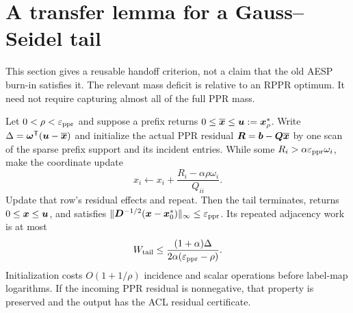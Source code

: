 \section{A transfer lemma for a Gauss--Seidel tail}
\label{sec:revisit-relative-tail}
This section gives a reusable handoff criterion, not a claim that the old
AESP burn-in satisfies it. The relevant mass deficit is relative to an RPPR
optimum. It need not require capturing almost all of the full PPR mass.

\begin{proposition}
\label{prop:revisit-relative-tail}
Let $0<\rho<\varepsilon_{\mathrm{ppr}}$ and suppose a prefix returns
$0\leq\overline{\bm{x}}\leq\bm{u}:=\bm{x}_\rho^*$.
Write $\Delta=\bm{\omega}^{\mathsf{T}}(\bm{u}-\overline{\bm{x}})$ and initialize the actual
PPR residual $\bm R=\bm{b}-\bm{Q}\overline{\bm{x}}$ by one scan of the sparse prefix
support and its incident entries. While some
$R_i>\alpha\varepsilon_{\mathrm{ppr}}\omega_i$, make the coordinate update
\begin{equation}
 x_i\gets x_i+\frac{R_i-\alpha\rho\omega_i}{Q_{ii}}.
 \label{eq:revisit-reserved-gs}
\end{equation}
Update that row's residual effects and repeat. Then the tail terminates,
returns $0\leq\bm{x}\leq\bm{u}$, and satisfies
$\|\bm{D}^{-1/2}(\bm{x}-\bm{x}_0^*)\|_\infty\leq\varepsilon_{\mathrm{ppr}}$.
Its repeated adjacency work is at most
\begin{equation}
 W_{\rm tail}\leq
 \frac{(1+\alpha)\Delta}{2\alpha(\varepsilon_{\mathrm{ppr}}-\rho)}.
 \label{eq:revisit-relative-tail-work}
\end{equation}
Initialization costs $O(1+1/\rho)$ incidence and scalar operations before
label-map logarithms. If the incoming PPR residual is nonnegative, that
property is preserved and the output has the ACL residual certificate.
\end{proposition}
